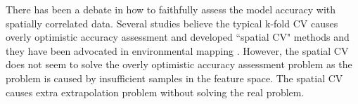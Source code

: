 \documentclass{article}
\begin{document}

There has been a debate in how to faithfully assess the model accuracy with spatially correlated data. Several studies believe the typical k-fold CV causes overly optimistic accuracy assessment and developed ``spatial CV" methods  \citep{brenning2012spatial,meyer2018improving} and they have been advocated in environmental mapping \citep{ploton2020spatial}. However, the spatial CV does not seem to solve the overly optimistic accuracy assessment problem as the problem is caused by insufficient samples in the feature space. The spatial CV causes extra extrapolation problem \citep{wadoux2021spatial} without solving the real problem.  

 
\end{document}
